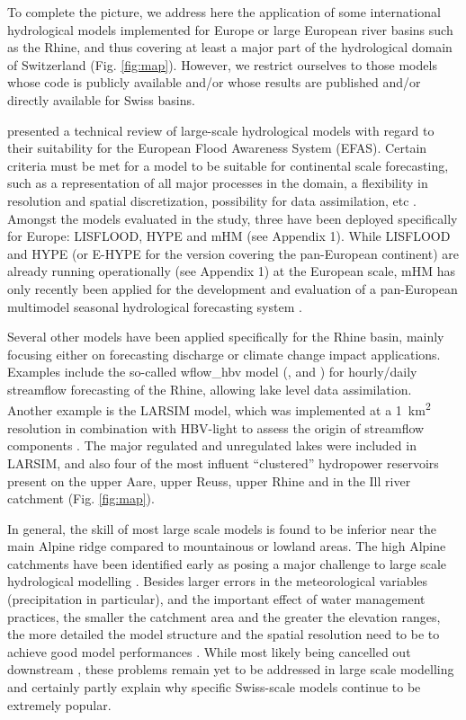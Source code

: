 \documentclass[10pt,a4paper]{article}
\begin{document}
To complete the picture, we address here the application of some international hydrological models implemented for Europe or large European river basins such as the Rhine, and thus covering at least a major part of the hydrological domain of Switzerland (Fig. \ref{fig:map}). However, we restrict ourselves to those models whose code is publicly available and/or whose results are published and/or directly available for Swiss basins.

\citet{Kauffeldt_2016} presented a technical review of large-scale hydrological models with regard to their suitability for the European Flood Awareness System (EFAS). Certain criteria must be met for a model to be suitable for continental scale forecasting, such as a representation of all major processes in the domain, a flexibility in resolution and spatial discretization, possibility for data assimilation, etc \citep{Kauffeldt_2016}. Amongst the models evaluated in the study, three have been deployed specifically for Europe: LISFLOOD, HYPE and mHM (see Appendix 1). While LISFLOOD and HYPE (or E-HYPE for the version covering the pan-European continent) are already running operationally (see Appendix 1) at the European scale, mHM has only recently been applied for the development and evaluation of a pan-European multimodel seasonal hydrological forecasting system \citep{Wanders_2019}.

Several other models have been applied specifically for the Rhine basin, mainly focusing either on forecasting discharge or climate change impact applications. Examples include the so-called wflow\_hbv model (\citealp{van_Osnabrugge_2017}, \citealp{van_Osnabrugge_2019} and \citealt{van_Osnabrugge}) for hourly/daily streamflow forecasting of the Rhine, allowing lake level data assimilation. Another example is the LARSIM model, which was implemented at a 1~km\textsuperscript{2} resolution in combination with HBV-light to assess the origin of streamflow components \citep{m2017}. The major regulated and unregulated lakes were included in LARSIM, and also four of the most influent ``clustered'' hydropower reservoirs present on the upper Aare, upper Reuss, upper Rhine and in the Ill river catchment (Fig. \ref{fig:map}).

In general, the skill of most large scale models is found to be inferior near the main Alpine ridge compared to mountainous or lowland areas. The high Alpine catchments have been identified early as posing a major challenge to large scale hydrological modelling \citep{Kleinn_2005}.  Besides larger errors in the meteorological variables (precipitation in particular), and the important effect of water management practices, the smaller the catchment area and the greater the elevation ranges, the more detailed the model structure and the spatial resolution need to be to achieve good model performances \citep{Gurtz2003}. While most likely being cancelled out downstream \citep{Kleinn_2005}, these problems remain yet to be addressed in large scale modelling and certainly partly explain why specific Swiss-scale models continue to be extremely popular. 
\end{document}
